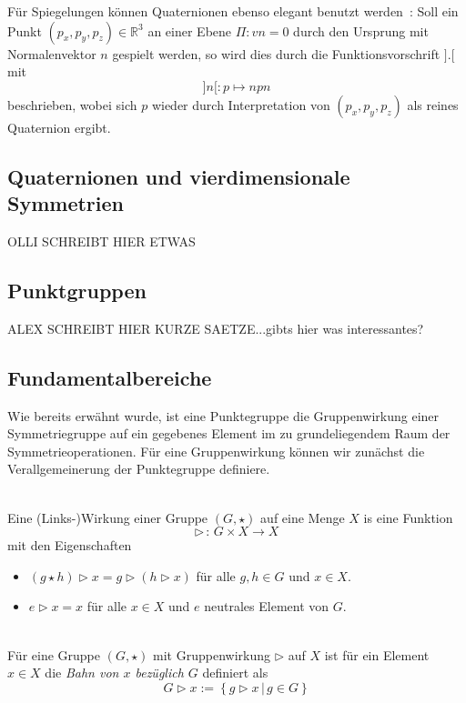 \noindent Für Spiegelungen können Quaternionen ebenso elegant benutzt werden~\cite{1946}: Soll ein Punkt  $(p_x, p_y, p_z) \in \mathbb{R}^3$
an einer Ebene $\Pi: vn = 0$ durch den Ursprung mit Normalenvektor $n$ gespielt werden, so wird dies durch die Funktionsvorschrift $].[$ mit
\begin{equation*}
]n[: p \mapsto n p n
\end{equation*}
beschrieben, wobei sich $p$ wieder durch Interpretation von $(p_x, p_y, p_z)$ als reines Quaternion ergibt.

\subsection{Quaternionen und vierdimensionale Symmetrien}
OLLI SCHREIBT HIER ETWAS

\subsection{Punktgruppen}
ALEX SCHREIBT HIER KURZE SAETZE...gibts hier was interessantes?

\subsection{Fundamentalbereiche}\label{fundamentalbereich}

Wie bereits erwähnt wurde, ist eine Punktegruppe die Gruppenwirkung einer Symmetriegruppe auf ein gegebenes Element im zu grundeliegendem Raum der Symmetrieoperationen.
Für eine Gruppenwirkung können wir zunächst die Verallgemeinerung der Punktegruppe definiere.

\begin{definition}[Gruppenwirkung]\label{fundamentalbereich:wirking} \mbox{}\\
 Eine (Links-)Wirkung einer Gruppe $(G, \star)$ auf eine Menge $X$ is eine Funktion
   $$
      \rhd \, : \, G \times X \longrightarrow X
   $$
   mit den Eigenschaften
   \begin{itemize}
      \item $(g \star h) \rhd x = g \rhd (h \rhd x)$ für alle $g,h \in G$ und $x \in X$.
      \item $e \rhd x = x$ für alle $x \in X$ und $e$ neutrales Element von $G$.
   \end{itemize}
\end{definition}

\begin{definition}[Orbit] \label{fundamentalbereich:orbit} \mbox{}\\
  Für eine Gruppe $(G, \star)$ mit Gruppenwirkung $\rhd$ auf $X$ ist für ein Element $x \in X$ die \emph{Bahn von $x$ bezüglich $G$} definiert als
   $$
      G \rhd x := \left\{ g \rhd x \, | \, g \in G \right\}
   $$
\end{definition}

